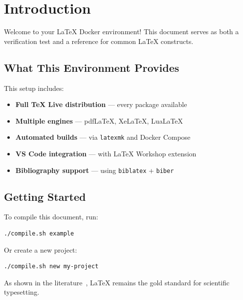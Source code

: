 \section{Introduction}
\label{sec:introduction}

Welcome to your LaTeX Docker environment! This document serves as both a
verification test and a reference for common LaTeX constructs.

\subsection{What This Environment Provides}

This setup includes:
\begin{itemize}
    \item \textbf{Full TeX Live distribution} — every package available
    \item \textbf{Multiple engines} — pdfLaTeX, XeLaTeX, LuaLaTeX
    \item \textbf{Automated builds} — via \texttt{latexmk} and Docker Compose
    \item \textbf{VS Code integration} — with LaTeX Workshop extension
    \item \textbf{Bibliography support} — using \texttt{biblatex} + \texttt{biber}
\end{itemize}

\subsection{Getting Started}

To compile this document, run:
\begin{lstlisting}[language=bash]
./compile.sh example
\end{lstlisting}

Or create a new project:
\begin{lstlisting}[language=bash]
./compile.sh new my-project
\end{lstlisting}

As shown in the literature~\cite{knuth1984texbook, lamport1994latex}, \LaTeX{}
remains the gold standard for scientific typesetting.
